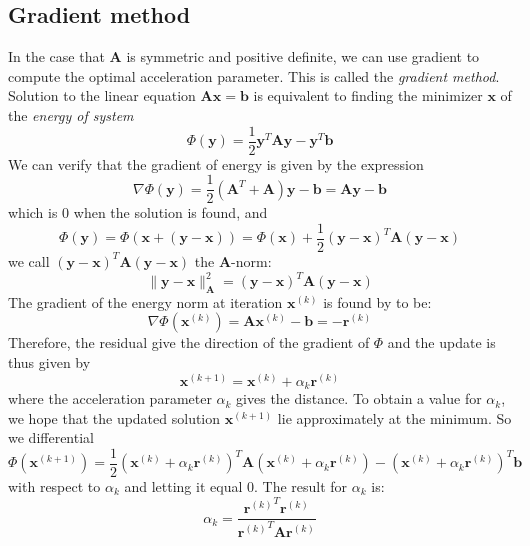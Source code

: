 \documentclass{article}
\begin{document}
\subsection{Gradient method}
In the case that $\mathbf{A}$ is symmetric and positive definite, we can use gradient
to compute the optimal acceleration parameter. This is called the 
\emph{gradient method}. 
Solution to the linear equation $\mathbf{A}\mathbf{x} = \mathbf{b}$ is equivalent 
to finding the minimizer $\mathbf{x}$ of the \emph{energy of system}
\begin{equation}
    \Phi(\mathbf{y}) 
    = \frac{1}{2}\mathbf{y}^T \mathbf{A} \mathbf{y} - \mathbf{y}^T \mathbf{b}
\end{equation}
We can verify that the gradient of energy is given by the expression
\begin{equation}
    \nabla \Phi(\mathbf{y}) = \frac{1}{2} (\mathbf{A}^T + \mathbf{A}) \mathbf{y} - \mathbf{b}
     = \mathbf{A} \mathbf{y} - \mathbf{b}
\end{equation}
which is 0 when the solution is found, and
\begin{equation}
    \Phi(\mathbf{y}) = \Phi(\mathbf{x} + (\mathbf{y} - \mathbf{x}))
    = \Phi(\mathbf{x}) + \frac{1}{2} (\mathbf{y} - \mathbf{x}) ^T \mathbf{A} (\mathbf{y} - \mathbf{x})
\end{equation}
we call $(\mathbf{y} - \mathbf{x}) ^T \mathbf{A} (\mathbf{y} - \mathbf{x})$ 
the $\mathbf{A}$-norm: 
\begin{equation}
    \|\mathbf{y} - \mathbf{x}\|^2_{\mathbf{A}} 
    = (\mathbf{y} - \mathbf{x}) ^T \mathbf{A} (\mathbf{y} - \mathbf{x})
\end{equation} 
The gradient of the energy norm at iteration $\mathbf{x}^{(k)}$ is found by to be:
\begin{equation}
    \nabla \Phi(\mathbf{x}^{(k)}) = \mathbf{A} \mathbf{x}^{(k)} - \mathbf{b} = -\mathbf{r}^{(k)}
\end{equation}
Therefore, the residual give the direction of the gradient of $\Phi$ and the 
update is thus given by
\begin{equation}
    \mathbf{x}^{(k+1)} = \mathbf{x}^{(k)} + \alpha_k \mathbf{r}^{(k)}
\end{equation}
where the acceleration parameter $\alpha_k$ gives the distance. 
To obtain a value for $\alpha_k$, 
we hope that the updated solution $\mathbf{x}^{(k+1)}$ lie approximately at the minimum. So we 
differential 
\begin{equation}
    \Phi(\mathbf{x}^{(k+1)}) 
    = \frac{1}{2}(\mathbf{x}^{(k)} + \alpha_k \mathbf{r}^{(k)})^T 
    \mathbf{A} (\mathbf{x}^{(k)} + \alpha_k \mathbf{r}^{(k)}) 
    - (\mathbf{x}^{(k)} + \alpha_k \mathbf{r}^{(k)})^T \mathbf{b}
\end{equation}
with respect to $\alpha_k$ and letting it equal 0. The result for $\alpha_k$ is:
\begin{equation}
    \label{alpha_k}
    \alpha_k = 
    \frac{\left.\mathbf{r}^{(k)}\right.^T \mathbf{r}^{(k)}}
    {\left.\mathbf{r}^{(k)}\right.^T \mathbf{A} \mathbf{r}^{(k)}}
\end{equation}
\end{document}
